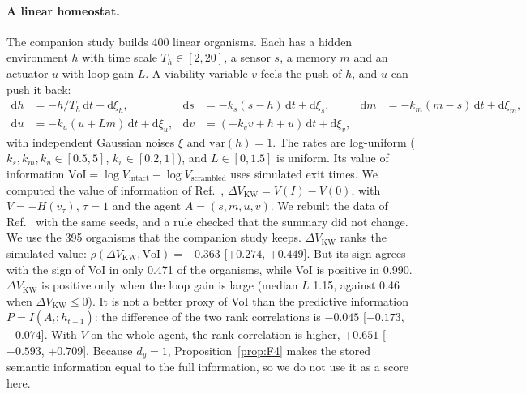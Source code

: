 \documentclass[11pt]{article}
\newcommand{\DVKW}{\Delta V_{\mathrm{KW}}}
\begin{document}
\paragraph{A linear homeostat.} The companion study \cite{Beiro26} builds 400 linear organisms. Each has a hidden
environment $h$ with time scale $T_h\in[2,20]$, a sensor $s$, a memory $m$ and an actuator $u$ with loop gain $L$. A
viability variable $v$ feels the push of $h$, and $u$ can push it back:
\begin{equation}
\begin{aligned}
  \mathrm{d}h &= -h/T_h\,\mathrm{d}t + \mathrm{d}\xi_h, &
  \mathrm{d}s &= -k_s(s-h)\,\mathrm{d}t + \mathrm{d}\xi_s, &
  \mathrm{d}m &= -k_m(m-s)\,\mathrm{d}t + \mathrm{d}\xi_m,\\
  \mathrm{d}u &= -k_u(u+Lm)\,\mathrm{d}t + \mathrm{d}\xi_u, &
  \mathrm{d}v &= (-k_vv+h+u)\,\mathrm{d}t + \mathrm{d}\xi_v , & &
\end{aligned}
\label{eq:homeostat}
\end{equation}
with independent Gaussian noises $\xi$ and $\mathrm{var}(h)=1$. The rates are log-uniform ($k_s,k_m,k_u\in[0.5,5]$,
$k_v\in[0.2,1]$), and $L\in[0,1.5]$ is uniform. Its value of information
$\mathrm{VoI}=\log V_{\mathrm{intact}}-\log V_{\mathrm{scrambled}}$ uses simulated exit times. We computed the value of
information of Ref.~\cite{KolchinskyWolpert18}, $\DVKW=V(I)-V(0)$, with $V=-H(v_\tau)$, $\tau=1$ and the agent
$A=(s,m,u,v)$. We rebuilt the data of Ref.~\cite{Beiro26} with the same seeds, and a rule checked that the summary did
not change. We use the 395 organisms that the companion study keeps. $\DVKW$ ranks the simulated value: $\rho(\DVKW,\mathrm{VoI})=+0.363$
[$+0.274$, $+0.449$]. But its sign agrees with the sign of VoI in only 0.471 of the organisms, while VoI is positive in
0.990. $\DVKW$ is positive only when the loop gain is large (median $L$ 1.15, against 0.46 when $\DVKW\le0$). It is
not a better proxy of VoI than the predictive information $P=I(A_t;h_{t+1})$: the difference of the two rank
correlations is $-0.045$ [$-0.173$, $+0.074$]. With $V$ on the whole agent, the rank correlation is higher, $+0.651$
[$+0.593$, $+0.709$]. Because $d_y=1$, Proposition~\ref{prop:F4} makes the stored semantic information equal to the full
information, so we do not use it as a score here.
\end{document}
